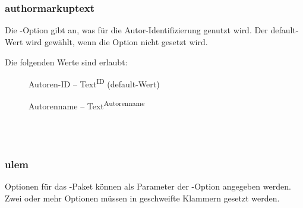 \begin{chusage}
		\>\\
	\usageexample
		\> \Corresponds\ \\
		\>
\end{chusage}



\subsubsection{authormarkuptext}

Die -Option gibt an, was für die Autor-Identifizierung genutzt wird.
Der default-Wert wird gewählt, wenn die Option nicht gesetzt wird.

Die folgenden Werte sind erlaubt:
\begin{description}
	\item [] Autoren-ID -- Text\textsuperscript{ID} (default-Wert)
	\item [] Autorenname -- Text\textsuperscript{Autorenname}
\end{description}

\begin{chusage}
		\>\\
	\usageexample
		\> \Corresponds\ \\
		\>
\end{chusage}



\subsubsection{ulem}

Optionen für das -Paket können als Parameter der -Option angegeben werden.
Zwei oder mehr Optionen müssen in geschweifte Klammern gesetzt werden.

\begin{chusage}
		\>\\
	\usageexample
		\>\\
		\>
\end{chusage}



